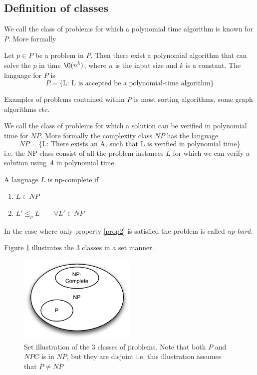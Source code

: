 \documentclass[10pt]{article}
\begin{document}


\subsection{Definition of classes} %
\label{sub:definition_of_classes}

We call the class of problems for which a polynomial time algorithm is known for $P$. More formally  
\begin{definition}
Let $p \in P$ be a problem in $P$. Then there exist a polynomial algorithm that can solve the $p$ in time $\O(n^k)$, where $n$ is the input size and $k$ is a constant. The language for $P$ is
\begin{equation}
  P = \{\text{L: L is accepted be a polynomial-time algorithm}\}
\end{equation}
\end{definition}
Examples of problems contained within $P$ is most sorting algorithms, some graph algorithms etc.

We call the class of problems for which a solution can be verified in polynomial time for $NP$. More formally the complexity class $NP$ has the language
\begin{equation}
  NP = \{\text{L: There exists an A, such that L is verified in polynomial time}\}
\end{equation}
i.e. the NP class consist of all the problem instances $L$ for which we can verify a solution using $A$ in polynomial time.

A language $L$ is np-complete if 
\begin{enumerate}
  \item $L \in NP$
  \item $L' \leq_p L \qquad \forall L' \in NP$ \label{prop2}
\end{enumerate}
In the case where only property \ref{prop2} is satisfied the problem is called \emph{np-hard}.

Figure \ref{fig5} illustrates the 3 classes in a set manner.
\begin{figure}[ht]
\centering
\includegraphics[width=0.5\textwidth]{figures/fig5.pdf}
\caption{Set illustration of the 3 classes of problems. Note that both $P$ and $NPC$ is in $NP$, but they are disjoint i.e. this illustration assumes that $P \neq NP$}
\label{fig5}
\end{figure}
\end{document}
